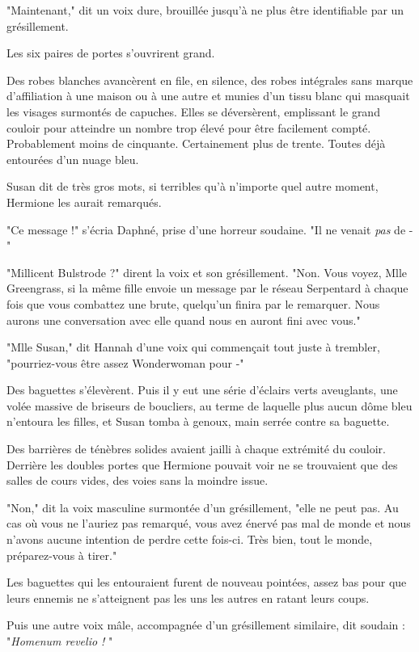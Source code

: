 "Maintenant," dit un voix dure, brouillée jusqu'à ne plus être identifiable par un grésillement.

Les six paires de portes s'ouvrirent grand.

Des robes blanches avancèrent en file, en silence, des robes intégrales sans marque d'affiliation à une maison ou à une autre et munies d'un tissu blanc qui masquait les visages surmontés de capuches. Elles se déversèrent, emplissant le grand couloir pour atteindre un nombre trop élevé pour être facilement compté. Probablement moins de cinquante. Certainement plus de trente. Toutes déjà entourées d'un nuage bleu.

Susan dit de très gros mots, si terribles qu'à n'importe quel autre moment, Hermione les aurait remarqués.

"Ce message !" s'écria Daphné, prise d'une horreur soudaine. "Il ne venait \emph{pas}  de -"

"Millicent Bulstrode ?" dirent la voix et son grésillement. "Non. Vous voyez, Mlle Greengrass, si la même fille envoie un message par le réseau Serpentard à chaque fois que vous combattez une brute, quelqu'un finira par le remarquer. Nous aurons une conversation avec elle quand nous en auront fini avec vous."

"Mlle Susan," dit Hannah d'une voix qui commençait tout juste à trembler, "pourriez-vous être assez Wonderwoman pour -"

Des baguettes s'élevèrent. Puis il y eut une série d'éclairs verts aveuglants, une volée massive de briseurs de boucliers, au terme de laquelle plus aucun dôme bleu n'entoura les filles, et Susan tomba à genoux, main serrée contre sa baguette.

Des barrières de ténèbres solides avaient jailli à chaque extrémité du couloir. Derrière les doubles portes que Hermione pouvait voir ne se trouvaient que des salles de cours vides, des voies sans la moindre issue.

"Non," dit la voix masculine surmontée d'un grésillement, "elle ne peut pas. Au cas où vous ne l'auriez pas remarqué, vous avez énervé pas mal de monde et nous n'avons aucune intention de perdre cette fois-ci. Très bien, tout le monde, préparez-vous à tirer."

Les baguettes qui les entouraient furent de nouveau pointées, assez bas pour que leurs ennemis ne s'atteignent pas les uns les autres en ratant leurs coups.

Puis une autre voix mâle, accompagnée d'un grésillement similaire, dit soudain : "\emph{Homenum revelio !} "

